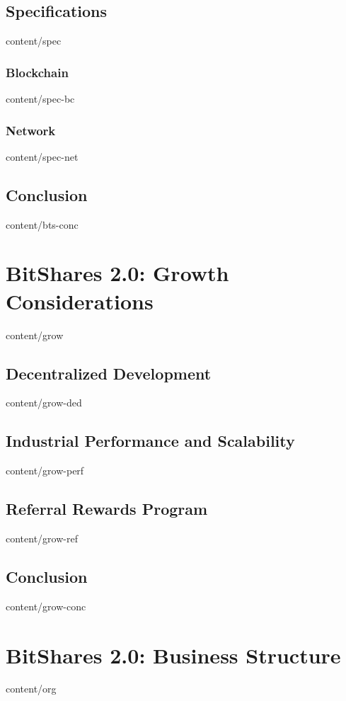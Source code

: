 \documentclass[conference,final,10pt,a4paper]{IEEEtran}
\begin{document}
\subsection    { Specifications                                   }  { content/spec          } 
\subsubsection { Blockchain                                       }  { content/spec-bc       } 
\subsubsection { Network                                          }  { content/spec-net      } 
\subsection    { Conclusion                                       }  { content/bts-conc      } 

\section       { BitShares 2.0: Growth Considerations             }  { content/grow          } 
\subsection    { Decentralized Development                        }  { content/grow-ded      } 
\subsection    { Industrial Performance and Scalability           }  { content/grow-perf     } 
\subsection    { Referral Rewards Program                         }  { content/grow-ref      } 
\subsection    { Conclusion                                       }  { content/grow-conc     } 

\section       { BitShares 2.0: Business Structure                }  { content/org           } 
\end{document}
